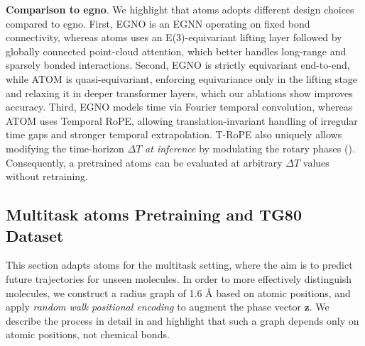 


{\textbf{Comparison to \gls{egno}}. We highlight that \gls{atoms} adopts different design choices compared to \gls{egno}. First, EGNO is an EGNN operating on fixed bond connectivity, whereas \gls{atoms} uses an E(3)-equivariant lifting layer followed by globally connected point-cloud attention, which better handles long-range and sparsely bonded interactions. Second, EGNO is strictly equivariant end-to-end, while ATOM is quasi-equivariant, enforcing equivariance only in the lifting stage and relaxing it in deeper transformer layers, which our ablations show improves accuracy. Third, EGNO models time via Fourier temporal convolution, whereas ATOM uses Temporal RoPE, allowing translation-invariant handling of irregular time gaps and stronger temporal extrapolation. T-RoPE also uniquely allows modifying the time-horizon \(\Delta T\) \textit{at inference} by modulating the rotary phases (). Consequently, a pretrained \gls{atoms} can be evaluated at arbitrary \(\Delta T\) values without retraining.}


\subsection{Multitask \gls{atoms} Pretraining and TG80 Dataset}
\label{sect:multi-pretrain}

\vspace{-0.1em}

This section adapts \gls{atoms} for the multitask setting, where the aim is to predict future trajectories for unseen molecules. In order to more effectively distinguish molecules, we construct a radius graph of 1.6 \AA{} based on atomic positions, and apply \textit{random walk positional encoding} \cite{ma_graph_2023, lobato_highs_2021} to augment the phase vector $\mathbf{z}$. We describe the process in detail in  and highlight that such a graph depends only on atomic positions, not chemical bonds. 


